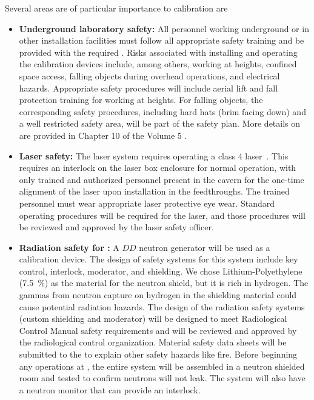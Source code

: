 Several areas are of particular importance to calibration are
\begin{itemize}
\item {\bf Underground laboratory safety:} All personnel working underground or in other installation facilities must follow all appropriate safety training and be provided with the required . Risks associated with installing and operating the calibration devices include, among others, working at heights, confined space access, falling objects during overhead operations, and electrical hazards. Appropriate safety procedures will include aerial lift and fall protection training for working at heights. For falling objects, the corresponding safety procedures, including hard hats (brim facing down) and a well restricted safety area, will be part of the safety plan. More details on  are provided in Chapter 10 of the Volume 5  .

\item {\bf Laser safety:} The laser system requires operating a class 4 laser~\cite{FNAL:Class4Lasers,CERN:Class4Lasers}. This requires an interlock on the laser box enclosure for normal operation, with only trained and authorized personnel present in the cavern for the one-time alignment of the laser upon installation in the feedthroughs. The trained personnel must wear appropriate laser protective eye wear. Standard operating procedures will be required for the laser, and those procedures will be reviewed and approved by the  laser safety officer. 

\item {\bf Radiation safety for :} A $DD$ neutron generator will be used as a calibration device. The design of safety systems for this system include key control, interlock, moderator, and shielding. We chose Lithium-Polyethylene (\SI{7.5}{\%}) as the material for the neutron shield, but it is rich in hydrogen. The gammas from neutron capture on hydrogen in the shielding material could cause potential radiation hazards. The design of the radiation safety systems (custom shielding and moderator) will be designed to meet  Radiological Control Manual safety requirements and will be reviewed and approved by the  radiological control organization. Material safety data sheets will be submitted to the   to explain other safety hazards like fire. Before beginning any operations at , the entire system will be assembled in a neutron shielded room and tested to confirm neutrons will not leak. The system will also have a neutron monitor that can provide an interlock. 


\end{itemize}
